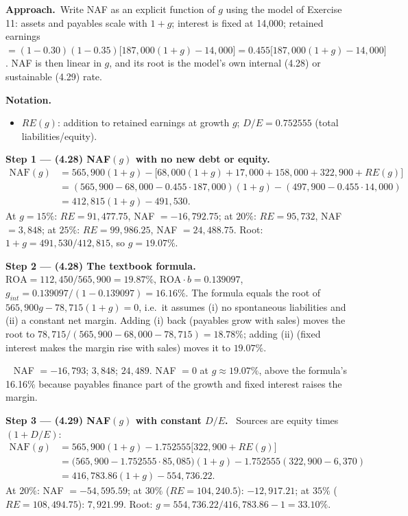 \documentclass[11pt,a4paper]{article}
\newcommand{\notation}{\par\noindent\textbf{Notation.}}
\newcommand{\step}[2]{\par\medskip\noindent\textbf{Step #1 --- #2.}~}
\newcommand{\approach}{\par\smallskip\noindent\textbf{Approach.}~}
\newcommand{\answer}[1]{\par\smallskip\noindent\fbox{\textbf{Answer #1.}}~}
\begin{document}
\approach Write NAF as an explicit function of $g$ using the model of Exercise 11: assets and payables
scale with $1+g$; interest is fixed at 14,000; retained earnings
$=(1-0.30)(1-0.35)\big[187{,}000(1+g)-14{,}000\big]=0.455\big[187{,}000(1+g)-14{,}000\big]$.
NAF is then linear in $g$, and its root is the model's own internal (4.28) or sustainable (4.29) rate.

\notation
\begin{itemize}
  \item $RE(g)$: addition to retained earnings at growth $g$; $D/E=0.752555$ (total liabilities/equity).
\end{itemize}

\step{1}{(4.28) NAF$(g)$ with no new debt or equity}
\begin{align}
  \text{NAF}(g) &= 565{,}900(1+g)-\big[68{,}000(1+g)+17{,}000+158{,}000+322{,}900+RE(g)\big] \nonumber\\
  &= (565{,}900-68{,}000-0.455\cdot187{,}000)(1+g)-(497{,}900-0.455\cdot14{,}000) \nonumber\\
  &= 412{,}815(1+g)-491{,}530. \label{r2ce14-28}
\end{align}
At $g=15\%$: $RE=91{,}477.75$, NAF $=-16{,}792.75$; at $20\%$: $RE=95{,}732$, NAF $=3{,}848$; at $25\%$:
$RE=99{,}986.25$, NAF $=24{,}488.75$. Root: $1+g=491{,}530/412{,}815$, so $g=19.07\%$.

\step{2}{(4.28) The textbook formula} $\text{ROA}=112{,}450/565{,}900=19.87\%$, $\text{ROA}\cdot b=0.139097$,
$g_{int}=0.139097/(1-0.139097)=16.16\%$. The formula equals the root of
$565{,}900g-78{,}715(1+g)=0$, i.e.\ it assumes (i) no spontaneous liabilities and (ii) a constant net
margin. Adding (i) back (payables grow with sales) moves the root to $78{,}715/(565{,}900-68{,}000-78{,}715)=18.78\%$;
adding (ii) (fixed interest makes the margin rise with sales) moves it to $19.07\%$.
\answer{(4.28)} NAF $=-16{,}793$; $3{,}848$; $24{,}489$. NAF $=0$ at $g\approx19.07\%$, above the formula's
16.16\% because payables finance part of the growth and fixed interest raises the margin.

\step{3}{(4.29) NAF$(g)$ with constant $D/E$} Sources are equity times $(1+D/E)$:
\begin{align}
  \text{NAF}(g) &= 565{,}900(1+g)-1.752555\big[322{,}900+RE(g)\big] \nonumber\\
  &= \big(565{,}900-1.752555\cdot85{,}085\big)(1+g)-1.752555(322{,}900-6{,}370) \nonumber\\
  &= 416{,}783.86(1+g)-554{,}736.22. \label{r2ce14-29}
\end{align}
At $20\%$: NAF $=-54{,}595.59$; at $30\%$ ($RE=104{,}240.5$): $-12{,}917.21$; at $35\%$
($RE=108{,}494.75$): $7{,}921.99$. Root: $g=554{,}736.22/416{,}783.86-1=33.10\%$.
\end{document}
